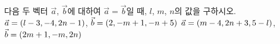 다음 두 벡터 $\vec{a}$, $\vec{b}$에 대하여 $\vec{a}=\vec{b}$일 때, $l$, $m$, $n$의 값을 구하시오.
 $\vec{a}=(l-3{,}\mkern3mu\mathopen{}-4{,}\mkern3mu\mathopen{}2n-1)$, $\vec{b}=(2{,}\mkern3mu\mathopen{}-m+1{,}\mkern3mu\mathopen{}-n+5)$
 $\vec{a}=(m-4{,}\mkern3mu\mathopen{}2n+3{,}\mkern3mu\mathopen{}5-l)$, $\vec{b}=(2m+1{,}\mkern3mu\mathopen{}-m{,}\mkern3mu\mathopen{}2n)$
